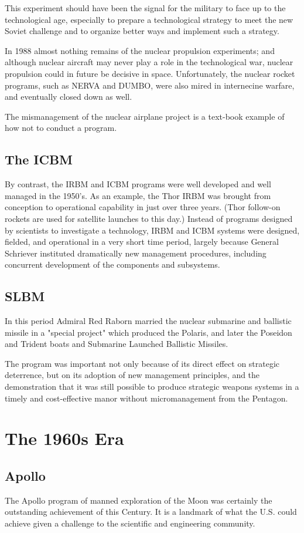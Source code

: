 \documentclass[a4paper,12pt]{book}
\begin{document}
This experiment should have been the signal for the military to face up to the technological age, especially to prepare a technological strategy to meet the new Soviet challenge and to organize better ways and implement such a strategy.

In 1988 almost nothing remains of the nuclear propulsion experiments; and although nuclear aircraft may never play a role in the technological war, nuclear propulsion could in future be decisive in space. Unfortunately, the nuclear rocket programs, such as NERVA and DUMBO, were also mired in internecine warfare, and eventually closed down as well.

The mismanagement of the nuclear airplane project is a text-book example of how not to conduct a program.

\subsection{The ICBM}
By contrast, the IRBM and ICBM programs were well developed and well managed in the 1950's. As an example, the Thor IRBM was brought from conception to operational capability in just over three years. (Thor follow-on rockets are used for satellite launches to this day.) Instead of programs designed by scientists to investigate a technology, IRBM and ICBM systems were designed, fielded, and operational in a very short time period, largely because General Schriever instituted dramatically new management procedures, including concurrent development of the components and subsystems.

\subsection{SLBM}
In this period Admiral Red Raborn married the nuclear submarine and ballistic missile in a "special project" which produced the Polaris, and later the Poseidon and Trident boats and Submarine Launched Ballistic Missiles.

The program was important not only because of its direct effect on strategic deterrence, but on its adoption of new management principles, and the demonstration that it was still possible to produce strategic weapons systems in a timely and cost-effective manor without micromanagement from the Pentagon.

\section{The 1960s Era}
\subsection{Apollo}
The Apollo program of manned exploration of the Moon was certainly the outstanding achievement of this Century. It is a landmark of what the U.S. could achieve given a challenge to the scientific and engineering community.
\end{document}
